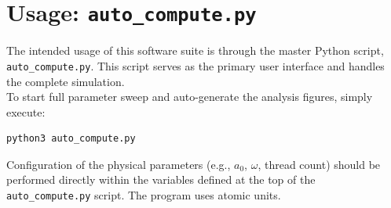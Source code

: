 \documentclass[11pt, a4paper]{article}
\begin{document}
\section{Usage: \texttt{auto\_compute.py}}
The intended usage of this software suite is through the master Python script, \texttt{auto\_compute.py}. This script serves as the primary user interface and handles the complete simulation.\\
To start full parameter sweep and auto-generate the analysis figures, simply execute:
\begin{lstlisting}[language=bash]
python3 auto_compute.py
\end{lstlisting}
Configuration of the physical parameters (e.g., $a_0$, $\omega$, thread count) should be performed directly within the variables defined at the top of the \texttt{auto\_compute.py} script. The program uses atomic units.
\end{document}

